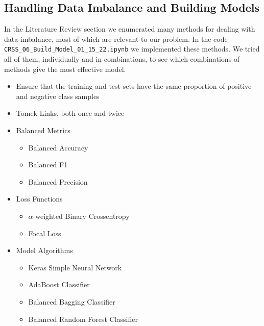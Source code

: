 \subsection{Handling Data Imbalance and Building Models}

In the Literature Review section we enumerated many methods for dealing with data imbalance, most of which are relevant to our problem.  In the code \verb|CRSS_06_Build_Model_01_15_22.ipynb| we implemented these methods.  We tried all of them, individually and in combinations, to see which combinations of methods give the most effective model.  

\begin{itemize}
	\item Ensure that the training and test sets have the same proportion of positive and negative class samples
	\item Tomek Links, both once and twice
	\item Balanced Metrics
	\begin{itemize}
		\item Balanced Accuracy
		\item Balanced F1
		\item Balanced Precision
	\end{itemize}
	\item Loss Functions
	\begin{itemize}
		\item $\alpha$-weighted Binary Crossentropy
		\item Focal Loss
	\end{itemize}
	\item Model Algorithms
	\begin{itemize}
		\item Keras Simple Neural Network
		\item AdaBoost Classifier
		\item Balanced Bagging Classifier
		\item Balanced Random Forest Classifier
	\end{itemize}
\end{itemize}



